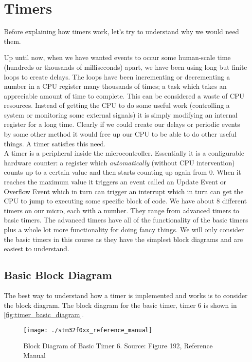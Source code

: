 \chapter{Timers}
Before explaining how timers work, let's try to understand why we would need them.

Up until now, when we have wanted events to occur some human-scale time (hundreds or thousands of milliseconds) apart, we have been using long but finite loops to create delays. The loops have been incrementing or decrementing a number in a CPU register many thousands of times; a task which takes an appreciable amount of time to complete. This can be considered a waste of CPU resources. Instead of getting the CPU to do some useful work (controlling a system or monitoring some external signals) it is simply modifying an internal register for a long time. 
Clearly if we could create our delays or periodic events by some other method it would free up our CPU to be able to do other useful things. 
A timer satisfies this need.\\


A timer is a peripheral inside the microcontroller. Essentially it is a configurable hardware counter: a register which \emph{automatically} (without CPU intervention) counts up to a certain value and then starts counting up again from 0. When it reaches the maximum value it triggers an event called an Update Event or Overflow Event which in turn can trigger an interrupt which in turn can get the CPU to jump to executing some specific block of code. We have about 8 different timers on our micro, each with a number. They range from advanced timers to basic timers. The advanced timers have all of the functionality of the basic timers plus a whole lot more functionality for doing fancy things. We will only consider the basic timers in this course as they have the simplest block diagrams and are easiest to understand. 

\section{Basic Block Diagram}
The best way to understand how a timer is implemented and works is to consider the block diagram. The block diagram for the basic timer, timer 6 is shown in \autoref{fig:timer_basic_diagram}.

\begin{figure}
\centering
\texttt{[image: ./stm32f0xx\_reference\_manual]}
\caption{Block Diagram of Basic Timer 6. Source: Figure 192, Reference Manual}
\label{fig:timer_basic_diagram}
\end{figure}

